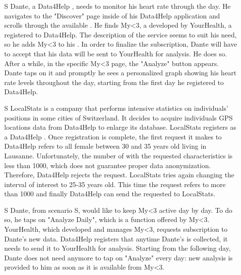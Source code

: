\documentclass[../../rasd.tex]{subfiles}
\begin{document}
\begin{itemize}
                    \item[S\subs{3}] Dante, a Data4Help , needs to monitor his heart rate through the day. He navigates to the "Discover" page inside of his Data4Help application and scrolls through the available . He finds My<3, a  developed by YourHealth, a  registered to Data4Help. The description of the service seems to suit his need, so he adds My<3 to his . In order to finalize the subscription, Dante will have to accept that his data will be sent to YourHealth for analysis. He does so. After a while, in the specific My<3  page, the "Analyze" button appears. Dante taps on it and promptly he sees a personalized graph showing his heart rate levels throughout the day, starting from the first day he registered to Data4Help.

                    \item[S\subs{4}] LocalStats is a company that performs intensive statistics on individuals' positions in some cities of Switzerland. It decides to acquire individuals GPS locations data from Data4Help to enlarge its database. LocalStats registers as a Data4Help . Once registration is complete, the first request it makes to Data4Help refers to all female  between 30 and 35 years old living in Lausanne. Unfortunately, the number of  with the requested characteristics is less than 1000, which does not guarantee proper data anonymization. Therefore, Data4Help rejects the  request. LocalStats tries again changing the interval of interest to 25-35 years old. This time the request refers to more than 1000  and finally Data4Help can send the requested  to LocalStats.

                    \item[S\subs{5}] Dante, from scenario S, would like to keep My<3 active day by day. To do so, he taps on "Analyze Daily", which is a function offered by My<3. YourHealth, which developed and manages My<3, requests subscription to Dante's new data. Data4Help registers that anytime Dante's  is collected, it needs to send it to YourHealth for analysis. Starting from the following day, Dante does not need anymore to tap on "Analyze" every day: new analysis is provided to him as soon as it is available from My<3.


\end{itemize}
\end{document}
